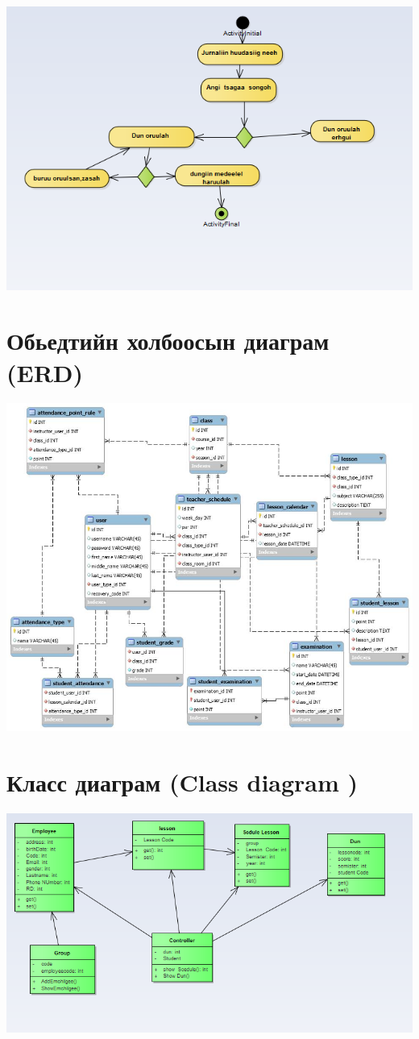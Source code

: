 \documentclass[12pd]{article}
\begin{document}
	\includegraphics[width=\textwidth]{ac4}
	\section{Обьедтийн  холбоосын  диаграм (ERD)}
	\includegraphics[width=\textwidth]{jurnal}
	\section {Класс  диаграм (Class diagram )}
		\includegraphics[width=\textheight]{clss}
\end{document}
